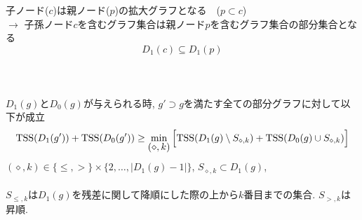 \begin{tcolorbox}[colbacktitle=gray, title={\fontsize{35pt}{0pt}\selectfont 枝刈り規則}]
	 \\
	\vspace{10pt}\\
	子ノード($c$)は親ノード($p$)の拡大グラフとなる　($p \subset c$) \\ 
	$\rightarrow$ 子孫ノード$c$を含むグラフ集合は親ノード$p$を含むグラフ集合の部分集合となる \\
	\begin{equation*}
		D_1(c) \subseteq D_1(p)
	\end{equation*}
	\vspace{15pt}\\
	 \\
	\vspace{10pt}\\
	$D_1(g)$と$D_0(g)$が与えられる時, $g' \supset g$を満たす全ての部分グラフに対して以下が成立
	\begin{eqnarray*}
		\TSS(D_1(g')) + \TSS(D_0(g')) \geq 
		\mymin{(\diamond,k)} \Big[\TSS(D_1(g) \setminus S_{\diamond, k}) + \TSS(D_0(g) \cup S_{\diamond, k}) \Big]
	\end{eqnarray*}
	$ (\diamond, k) \in \{ \leq, > \} \times \{ 2, \dots, |D_1(g) - 1| \} $,
	$S_{\diamond, k} \subset D_1(g)$,\\
	\vspace{5pt}\\
	$S_{\leq, k}$は$D_1(g)$を残差に関して降順にした際の上から$k$番目までの集合.
	$S_{>, k}$は昇順.
\end{tcolorbox}
